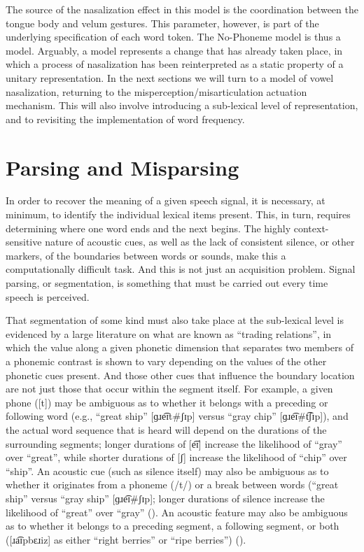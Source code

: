 The source of the nasalization effect in this model is the coordination
between the tongue body and velum gestures. This parameter, however,
is part of the underlying specification of each word token. The No-Phoneme
model is thus a  model. Arguably, a  model
represents a change that has already taken place, in which a process
of nasalization has been reinterpreted as a static property of a unitary
representation. In the next sections we will turn to a 
model of vowel nasalization, returning to the misperception/misarticulation
actuation mechanism. This will also involve introducing a sub-lexical
level of representation, and to revisiting the implementation of word
frequency.

\section{Parsing and Misparsing}

In order to recover the meaning of a given speech signal, it is necessary,
at minimum, to identify the individual lexical items present. This,
in turn, requires determining where one word ends and the next begins.
The highly context-sensitive nature of acoustic cues, as well as the
lack of consistent silence, or other markers, of the boundaries between
words or sounds, make this a computationally difficult task. And this
is not just an acquisition problem. Signal parsing, or segmentation,
is something that must be carried out every time speech is perceived. 

That segmentation of some kind must also take place at the sub-lexical
level is evidenced by a large literature on what are known as “trading
relations”, in which the value along a given phonetic dimension
that separates two members of a phonemic contrast is shown to vary
depending on the values of the other phonetic cues present. And those
other cues that influence the boundary location are not just those
that occur within the segment itself. For example, a given phone ({[t]})
may be ambiguous as to whether it belongs with a preceding or following
word (e.g., “great ship” {[}{ɡɹe͡ɪt}\#{ʃɪp}{]}
versus “gray chip” {[}{ɡɹe͡ɪ}\#{t͡ʃɪp}{]}),
and the actual word sequence that is heard will depend on the durations
of the surrounding segments; longer durations of {[e͡ɪ]}
increase the likelihood of “gray” over “great”, while
shorter durations of {[ʃ]} increase the likelihood of “chip”
over “ship”. An acoustic cue (such as silence itself) may also
be ambiguous as to whether it originates from a phoneme ({/t/})
or a break between words (“great ship” versus “gray ship”
{[}{ɡɹe͡ɪ}\#{ʃɪp}{]}; longer durations of silence
increase the likelihood of “great” over “gray” (\citealt{repp1978perceptual}).
An acoustic feature may also be ambiguous as to whether it belongs
to a preceding segment, a following segment, or both ({[}{ɹa͡ɪpbɛɹiz}{]}
as either “right berries” or “ripe berries”) (\citealt{Gow2003}). 

